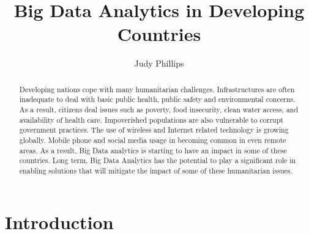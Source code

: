 \documentclass[sigconf]{acmart}
\begin{document}
\title{Big Data Analytics in Developing Countries}


\author{Judy Phillips}









\begin{abstract}
Developing nations cope with many humanitarian challenges. Infrastructures are often inadequate to deal with basic public health, public safety and environmental concerns. As a result, citizens deal issues such as poverty, food insecurity, clean water access, and availability of health care. Impoverished populations are also vulnerable to corrupt government practices. The use of wireless and Internet related technology is growing globally. Mobile phone and social media usage in becoming common in even remote areas.  As a result, Big Data analytics is starting to have an impact in some of these countries. Long term, Big Data Analytics has the potential to play a significant role in enabling solutions that will mitigate the impact of some of these humanitarian issues. 
\end{abstract}



\maketitle



\section{Introduction}
\end{document}
